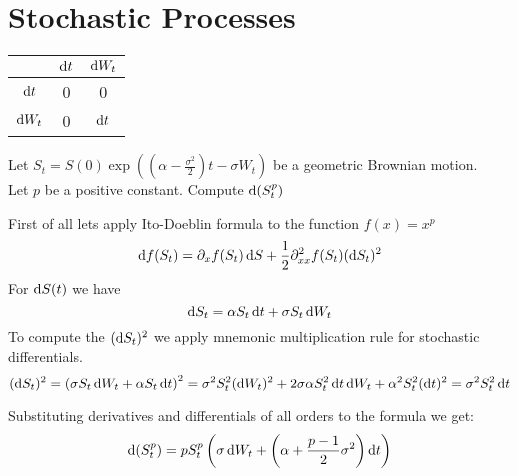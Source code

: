 \chapter{Stochastic Processes}

\begin{center}
	\begin{tabular}{ |c|c|c| } 
		\hline
			 	   & $\mathop{}\!\mathrm{d}{t}$ & $\mathop{}\!\mathrm{d}{W}_t$  \\ 
		\hline
		$\mathop{}\!\mathrm{d}{t}$  & 0 & 0 \\ 
		\hline
		$\mathop{}\!\mathrm{d}{W}_t$& 0 & $\mathop{}\!\mathrm{d}{t}$ \\ 
		\hline
	\end{tabular}
\end{center}

\begin{exc}[Shreve 4.6]
	Let $S_t = S(0)\exp((\alpha -\frac{\sigma^2}{2})t - \sigma W_t)$ be a geometric Brownian motion. \\
	Let $p$ be a positive constant. Compute $\mathop{}\!\mathrm{d}{(}S_{t}^{p}) $
\end{exc}

\begin{sol}
	 First of all lets apply Ito-Doeblin formula to the function $f(x) = x^p$
	 \begin{equation}
	 \begin{aligned}
	 	\mathop{}\!\mathrm{d}{f}(S_t) =  \partial_{x} f(S_t) \mathop{}\!\mathrm{d}{S} +  \frac{1}{2}\partial^{2}_{xx} f(S_t) (\mathop{}\!\mathrm{d}{S}_t)^2 \\
	 \end{aligned}
	 \end{equation}
 	 For $\mathop{}\!\mathrm{d}{S}(t)$ we have 
 	 \begin{equation}
 	 	\mathop{}\!\mathrm{d}{S}_t = \alpha S_t \mathop{}\!\mathrm{d}{t} + \sigma S_t \mathop{}\!\mathrm{d}{W}_t
 	 \end{equation}
  	To compute the $(\mathop{}\!\mathrm{d}{S}_t)^2$ we apply mnemonic multiplication rule for stochastic differentials.
  	\begin{equation}
  		(\diff S_t)^2 = \left(\sigma S_t \diff W_t + \alpha S_t \diff t\right)^2 = \sigma^2 S^{2}_{t} (\diff W_t)^2
  																				 + 2\sigma \alpha S^{2}_{t} \diff t \diff W_t 
  																				 + \alpha^2 S^{2}_{t}(\diff t)^2  = \sigma^2 S^{2}_{t} \diff t
  	\end{equation}
	
	Substituting derivatives and differentials of all orders to the formula we get:
	\begin{equation}
	\mathop{}\!\mathrm{d}{(}S_{t}^{p}) = p S^{p}_{t} \left(\sigma \mathop{}\!\mathrm{d}{W}_t + \left(\alpha  + \frac{p - 1}{2} \sigma^2\right)  \mathop{}\!\mathrm{d}{t}\right)
	\end{equation}
\end{sol}	



